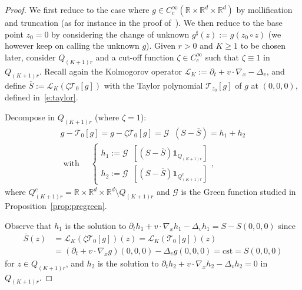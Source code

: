 \documentclass[10pt]{amsart}
\theoremstyle{definition}\newtheorem{defi}[theo]{Definition}\newtheorem{rema}[theo]{Remark}\newtheorem{exam}[theo]{Example}\newtheorem{exem}[theo]{Example}\newtheorem{nota}[theo]{Notation}
\DeclareMathOperator{\starkin}{\star_{\, kin}}
\newcommand{\R}{\mathbb{R}}
\newcommand{\cL}{\mathcal{L}}
\newcommand{\cT}{\mathcal{T}}
\newcommand{\cG}{\mathcal{G}}
\newcommand*\un{\mathbf{1}}
\begin{document}
\begin{proof}
We first reduce to the case where $g \in C^\infty_c (\R \times \R^d \times \R^d)$ by mollification and truncation (as for instance in the proof of~\cite[Lemma~8.7.1, p.~122]{krylov1996}). We then reduce to the base point $z_0=0$ by considering the change of unknown $g^\sharp(z) := g(z_0 \circ z)$ (we however keep on calling the unknown $g$). Given $r>0$ and $K \ge 1$ to be chosen later, consider $Q_{(K+1)r}$ and a cut-off function $\zeta \in C^\infty_c$ such that $\zeta \equiv 1$ in $Q_{(K+1)r}$. Recall again the Kolmogorov operator $\cL_K := \partial_t + v \cdot \nabla_x - \Delta_v$, and define $\bar S := \cL_K (\zeta \cT_{0}[g])$ with the Taylor polynomial $\cT_{z_0}[g]$ of $g$ at $(0,0,0)$, defined in~\eqref{e:taylor}.

Decompose in $Q_{(K+1)r}$ (where $\zeta =1$):
\begin{multline*}
g - \cT_{0}[g] = g - \zeta
\cT_{0}[g] = \cG \starkin (S -\bar S) = h_1 + h_2
\\
\text{ with } \quad
\begin{cases} h_1 := \cG \starkin \left[(S- \bar S)
\un_{Q_{(K+1)r}} \right]
 \\[2mm] h_2 := \cG \starkin \left[(S-\bar S) \un_{Q^c_{(K+1)r}} \right]
\end{cases},
\end{multline*}
where $Q^c_{(K+1)r} = \R \times \R^d \times \R^d \setminus Q_{(K+1)r}$ and $\cG$ is the Green function studied in Proposition~\ref{prop:pregreen}.

Observe that $h_1$ is the solution to $\partial_t h_1 + v \cdot \nabla_x h_1 -\Delta_v h_1 = S-S(0,0,0)$ since
\begin{align*}
\bar S(z) &= \cL_K(\zeta \cT_0[g])(z) = \cL_K(\cT_0[g])(z) \\
&= \left(\partial_t + v \cdot \nabla_x g\right)(0,0,0) - \Delta_v g(0,0,0) = \text{cst} = S(0,0,0)
\end{align*}
for $z \in Q_{(K+1)r}$, and $h_2$ is the solution to $\partial_t h_2 + v \cdot \nabla_x h_2- \Delta_v h_2 = 0$ in $Q_{(K+1)r}$.


\end{proof}
\end{document}
